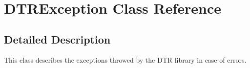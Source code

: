 \hypertarget{class_d_t_r_1_1_d_t_r_exception}{}\section{D\+T\+R\+Exception Class Reference}
\label{class_d_t_r_1_1_d_t_r_exception}


\subsection{Detailed Description}
This class describes the exceptions throwed by the D\+TR library in case of errors. 